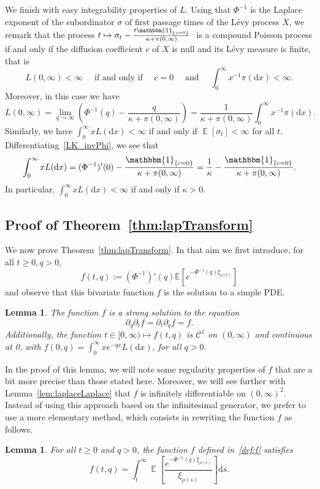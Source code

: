 \documentclass[10pt]{amsart}
\newtheorem{lemm}[theo]{Lemma}
\theoremstyle{definition}
\numberwithin{equation}{section}
\newcommand{\bbE}{\mathbb{E}}
\DeclareMathOperator{\E}{\mathbb{E}}
\newcommand{\dd}{\mathrm{d}}
\newcommand{\calC}{\mathcal{C}}
\newcommand{\ind}[1]{\mathbbm{1}_{\left\{#1\right\}}}
\begin{document}
We finish with easy integrability properties of $L$. Using that $\Phi^{-1}$ is the Laplace exponent of the subordinator $\sigma$ of first passage times of the Lévy process $X$, we remark that the process $t \mapsto \sigma_t - \frac{t \ind{c = 0}}{\kappa + \pi(0,\infty)}~$ is a compound Poisson process if and only if the diffusion coefficient $c$ of $X$ is null and its Lévy measure is finite, that is
\[
L(0,\infty) < \infty \quad \text{ if and only if } \quad c = 0 \quad \text{ and } \quad \int_0^\infty x^{-1} \pi(\dd  x) <\infty.
\]
Moreover, in this case we have
\[
L(0,\infty) = \lim_{q \to \infty} \left(\Phi^{-1}(q) - \frac{q}{\kappa + \pi(0,\infty)}\right) = \frac{1}{\kappa + \pi(0,\infty)} \int_0^\infty x^{-1} \pi(\dd x).
\]
Similarly, we have $\int_0^{\infty} x L(\dd x) < \infty$ if and only if $\E[\sigma_t] < \infty$ for all $t$. Differentiating~\eqref{LK_invPhi}, we see that
\[
\int_0^{\infty} x L(\dd x) = (\Phi^{-1})'(0) - \frac{\ind{c = 0}}{\kappa + \pi(0,\infty)} = \frac{1}{\kappa} - \frac{\ind{c = 0}}{\kappa + \pi(0,\infty)}.
\]
In particular, $\int_0^{\infty} x L(\dd x) < \infty$ if and only if $\kappa > 0$.
\setcounter{theo}{4}
\subsection{Proof of Theorem~\ref{thm:lapTransform}}\label{sec:proofThmain}

We now prove Theorem~\ref{thm:lapTransform}. In that aim we first introduce, for all $t \geq 0, q>0$,
\begin{equation}\label{def:f}
f(t,q):=(\Phi^{-1})'(q)\bbE\left[e^{-\Phi^{-1}(q) \xi_{\rho(t)}}\right]
\end{equation}
and observe that this bivariate function $f$ is the solution to a simple PDE.

\begin{lemm}\label{lem:easy}
The function $f$ is a strong solution to the equation
\begin{equation}\label{eq:easy}
\partial_q \partial_t f = \partial_t \partial_q f= f.
\end{equation}
Additionally, the function $t \in [0,\infty) \mapsto f(t,q)$ is $\calC^1$ on $(0,\infty)$ and continuous at 0, with $f(0,q)=\int_0^{\infty}xe^{-qx}L(\dd x)$, for all $q>0$.
\end{lemm}

In the proof of this lemma, we will note some regularity properties of $f$ that are a bit more precise than those stated here. Moreover, we will see further with Lemma~\ref{lem:laplaceLaplace} that $f$ is infinitely differentiable on $(0,\infty)^2$.
\setcounter{theo}{7}
Instead of using this approach based on the infinitesimal generator, we prefer to use a more elementary method, which consists in rewriting the function $f$ as follows.
\begin{lemm}\label{lem:rewritten}
For all $t \geq 0$ and $q > 0$, the function $f$ defined in~\eqref{def:f} satisfies
\[
f(t,q) = \int_t^\infty \E\left[\frac{e^{-\Phi^{-1}(q)\xi_{\rho(s)}}}{\xi_{\rho(s)}} \right] \dd s.
\]
\end{lemm}
\end{document}
